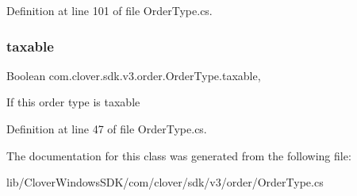 Definition at line 101 of file Order\+Type.\+cs.

\mbox{\label{classcom_1_1clover_1_1sdk_1_1v3_1_1order_1_1_order_type_ae54a438e3bdd8b0a7b211a9e022b64f8}} 
\subsubsection{\texorpdfstring{taxable}{taxable}}
{\footnotesize\ttfamily Boolean com.\+clover.\+sdk.\+v3.\+order.\+Order\+Type.\+taxable\hspace{0.3cm}{\ttfamily [get]}, {\ttfamily [set]}}



If this order type is taxable 



Definition at line 47 of file Order\+Type.\+cs.



The documentation for this class was generated from the following file\+:\begin{DoxyCompactItemize}
\item 
lib/\+Clover\+Windows\+S\+D\+K/com/clover/sdk/v3/order/Order\+Type.\+cs\end{DoxyCompactItemize}
